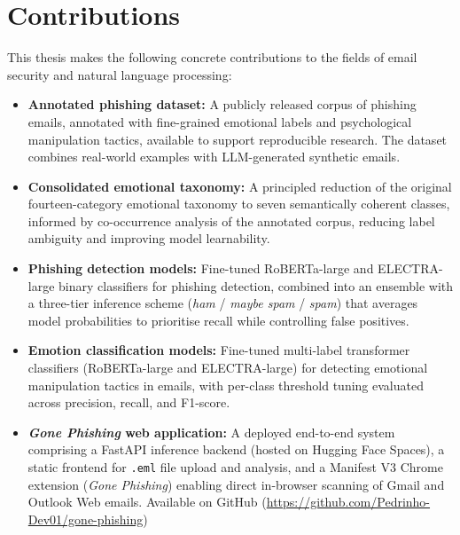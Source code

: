 \section{Contributions}
This thesis makes the following concrete contributions to the fields of email security and natural language processing:

\begin{itemize}
    \item \textbf{Annotated phishing dataset:} A publicly released corpus of phishing emails, annotated with fine-grained emotional labels and psychological manipulation tactics, available to support reproducible research. The dataset combines real-world examples with \ac{LLM}-generated synthetic emails.

    \item \textbf{Consolidated emotional taxonomy:} A principled reduction of the original fourteen-category emotional taxonomy to seven semantically coherent classes, informed by co-occurrence analysis of the annotated corpus, reducing label ambiguity and improving model learnability.

    \item \textbf{Phishing detection models:} Fine-tuned \ac{RoBERTa}-large and \ac{ELECTRA}-large binary classifiers for phishing detection, combined into an ensemble with a three-tier inference scheme (\textit{ham} / \textit{maybe spam} / \textit{spam}) that averages model probabilities to prioritise recall while controlling false positives.

    \item \textbf{Emotion classification models:} Fine-tuned multi-label transformer classifiers (RoBERTa-large and ELECTRA-large) for detecting emotional manipulation tactics in emails, with per-class threshold tuning evaluated across precision, recall, and F1-score.

    \item \textbf{\textit{Gone Phishing} web application:} A deployed end-to-end system comprising a FastAPI inference backend (hosted on Hugging Face Spaces), a static frontend for \texttt{.eml} file upload and analysis, and a Manifest V3 Chrome extension (\textit{Gone Phishing}) enabling direct in-browser scanning of Gmail and Outlook Web emails. Available on GitHub (\url{https://github.com/Pedrinho-Dev01/gone-phishing})
\end{itemize}

